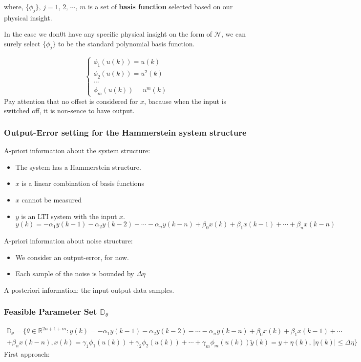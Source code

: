 where, $\{\phi_j\},\,j = 1,\,2,\,\cdots,\,m$ is a set of \textbf{basis function} selected based on our physical insight.

In the case we don0t have any specific physical insight on the form of $\mathcal{N}$, we can surely select $\{\phi_j\}$ to be the standard polynomial basis function.

\[
\begin{cases}
\phi_1(u(k)) = u(k)\\
\phi_2(u(k)) = u^2(k)\\
\cdots\\
\phi_m(u(k)) = u^m(k)
\end{cases}
\]
Pay attention that no offset is considered for $x$, bacause when the input is switched off, it is non-sence to have output.\\

\subsubsection{Output-Error setting for the Hammerstein system structure}
A-priori information about the system structure:
\begin{itemize}
    \item The system has a Hammerstein structure.
    \item $x$ is a linear combination of basis functions
    \item $x$ cannot be measured
    \item $y$ is an LTI system with the input $x$.\\
    \[
    y(k) = -\alpha_1y(k-1) - \alpha_2y(k-2) - \cdots - \alpha_n y(k-n) + \beta_0 x(k) + \beta_1 x(k-1) + \cdots + \beta_n x(k-n)
    \]
\end{itemize}

A-priori information about noise structure:
\begin{itemize}
    \item We consider an output-error, for now.
    \item Each sample of the noise is bounded by $\Delta \eta$
\end{itemize}

A-posteriori information: the input-output data samples.

\subsubsection{Feasible Parameter Set $\mathbb{D}_\theta$}
\[
\begin{array}{l}
\mathbb{D}_\theta = \{\theta \in \mathbb{R}^{2n + 1 + m}: 
    y(k) = -\alpha_1y(k-1) - \alpha_2y(k-2) - \cdots - \alpha_n y(k-n) + \beta_0 x(k) + \beta_1 x(k-1) + \cdots \\+ \beta_n x(k-n), x(k) = \gamma_1\phi_1(u(k)) + \gamma_2\phi_2(u(k)) + \cdots + \gamma_m\phi_m(u(k))
\tilde{y}(k) = y + \eta(k),\,|\eta(k)|\leq \Delta\eta
\}
\end{array}
\]
First approach:

